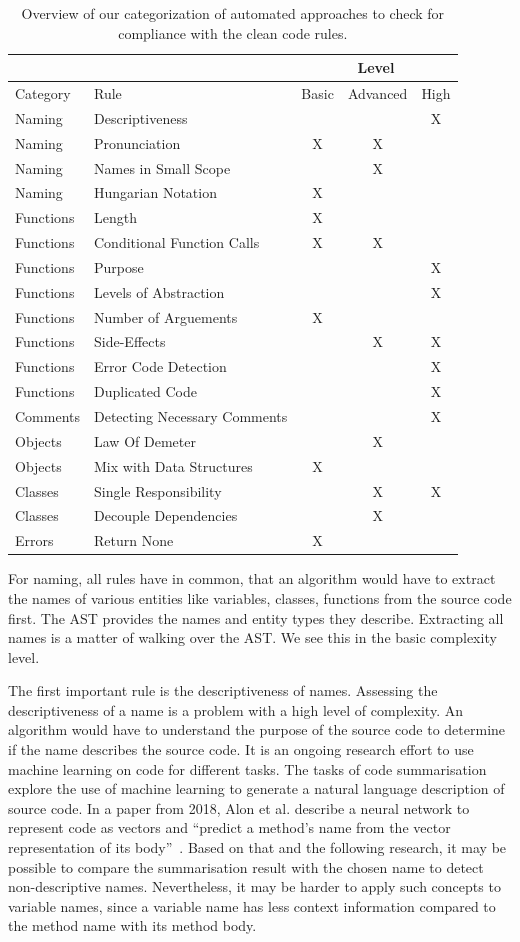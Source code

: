 \begin{table}[h]
\begin{tabularx}{\textwidth}{XXccc}
\toprule
&     & \multicolumn{3}{c}{Level} \\ \midrule
Category&Rule & Basic  & Advanced  & High \\ \midrule
Naming&Descriptiveness&&& X\\
Naming&Pronunciation&X&X& \\
Naming&Names in Small Scope&&X& \\
Naming&Hungarian Notation&X&& \\
Functions&Length&X&&\\
Functions&Conditional Function Calls&X&X& \\
Functions&Purpose&&&X\\
Functions&Levels of Abstraction&&&X\\
Functions&Number of Arguements&X&& \\
Functions&Side-Effects&&X&X\\
Functions&Error Code Detection&&&X \\
Functions&Duplicated Code&&&X \\
Comments&Detecting Necessary Comments&&&X \\
Objects&Law Of Demeter&&X& \\
Objects&Mix with Data Structures&X&& \\
Classes&Single Responsibility&&X&X \\
Classes&Decouple Dependencies&&X& \\
Errors&Return None&X&& \\
\bottomrule
\end{tabularx}
\caption{Overview of our categorization of automated approaches to check for compliance with the clean code rules.}
\label{tab:complexity_level_overview}
\end{table}

For naming, all rules have in common, that an algorithm would have to extract the names of various entities like variables, classes, functions from the source code first. The AST provides the names and entity types they describe. Extracting all names is a matter of walking over the AST. We see this in the basic complexity level.

The first important rule is the descriptiveness of names. Assessing the descriptiveness of a name is a problem with a high level of complexity. An algorithm would have to understand the purpose of the source code to determine if the name describes the source code. It is an ongoing research effort to use machine learning on code for different tasks. The tasks of code summarisation explore the use of machine learning to generate a natural language description of source code. In a paper from 2018, Alon et al. describe a neural network to represent code as vectors and \enquote{predict a method’s name from the vector representation of its body}~\cite{alon_code2vec_2018}. Based on that and the following research, it may be possible to compare the summarisation result with the chosen name to detect non-descriptive names. Nevertheless, it may be harder to apply such concepts to variable names, since a variable name has less context information compared to the method name with its method body.

